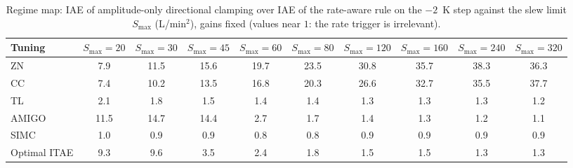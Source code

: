 \begin{table}[t]
\centering
\footnotesize
\caption{Regime map: IAE of amplitude-only directional clamping over IAE of the rate-aware rule on the $-2$~K step against the slew limit $S_{\max}$ (L/min$^2$), gains fixed (values near $1$: the rate trigger is irrelevant).}
\label{tab:smax_ratio}
\begin{tabular}{lccccccccc}
\toprule
Tuning & $S_{\max}=20$ & $S_{\max}=30$ & $S_{\max}=45$ & $S_{\max}=60$ & $S_{\max}=80$ & $S_{\max}=120$ & $S_{\max}=160$ & $S_{\max}=240$ & $S_{\max}=320$ \\
\midrule
ZN & 7.9 & 11.5 & 15.6 & 19.7 & 23.5 & 30.8 & 35.7 & 38.3 & 36.3 \\
CC & 7.4 & 10.2 & 13.5 & 16.8 & 20.3 & 26.6 & 32.7 & 35.5 & 37.7 \\
TL & 2.1 & 1.8 & 1.5 & 1.4 & 1.4 & 1.3 & 1.3 & 1.3 & 1.2 \\
AMIGO & 11.5 & 14.7 & 14.4 & 2.7 & 1.7 & 1.4 & 1.3 & 1.2 & 1.1 \\
SIMC & 1.0 & 0.9 & 0.9 & 0.8 & 0.8 & 0.9 & 0.9 & 0.9 & 0.9 \\
Optimal ITAE & 9.3 & 9.6 & 3.5 & 2.4 & 1.8 & 1.5 & 1.5 & 1.3 & 1.3 \\
\bottomrule
\end{tabular}
\end{table}
